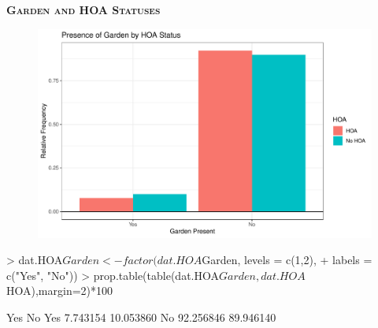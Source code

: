 \documentclass{article}
\begin{document}
\newpage
\textsc{\textbf{Garden and HOA Statuses}}
\newline
\newline
\begin{figure}[H]
		\centering
\includegraphics{exam23-026}
		\label{Fig:plot9}
	\end{figure}
\begin{Schunk}
\begin{Sinput}
> dat.HOA$Garden<-factor(dat.HOA$Garden, levels = c(1,2),
+                         labels = c("Yes", "No"))
> prop.table(table(dat.HOA$Garden, dat.HOA$HOA),margin=2)*100
\end{Sinput}
\begin{Soutput}
            Yes        No
  Yes  7.743154 10.053860
  No  92.256846 89.946140
\end{Soutput}
\end{Schunk}
\end{document}
